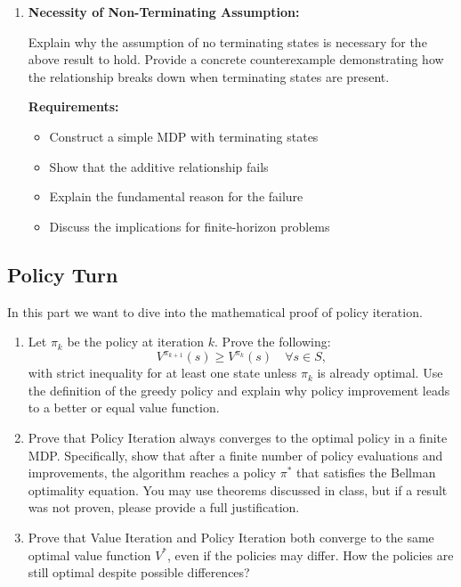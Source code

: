 \documentclass[12pt]{article}
\begin{document}
{{\begin{enumerate}[resume*]
    \textbf{Expected Result:} You should find that \( \hat{V}^*(s) = V^*(s) + \frac{r_0}{1-\gamma} \).

    \item \textbf{Necessity of Non-Terminating Assumption:}
    
    Explain why the assumption of no terminating states is necessary for the above result to hold. Provide a concrete counterexample demonstrating how the relationship breaks down when terminating states are present.
    
    \textbf{Requirements:}
    \begin{itemize}
        \item Construct a simple MDP with terminating states
        \item Show that the additive relationship fails
        \item Explain the fundamental reason for the failure
        \item Discuss the implications for finite-horizon problems
    \end{itemize}
\end{enumerate}



\subsection{Policy Turn}
In this part we want to dive into the mathematical proof of policy iteration.
\begin{enumerate}[resume*]
\item Let \( \pi_k \) be the policy at iteration \( k \). Prove the following:
    \[
    V^{\pi_{k+1}}(s) \geq V^{\pi_k}(s) \quad \forall s \in S,
    \]
    with strict inequality for at least one state unless \( \pi_k \) is already optimal. Use the definition of the greedy policy and explain why policy improvement leads to a better or equal value function.

    \item Prove that Policy Iteration always converges to the optimal policy in a finite MDP. Specifically, show that after a finite number of policy evaluations and improvements, the algorithm reaches a policy \( \pi^* \) that satisfies the Bellman optimality equation.  
    You may use theorems discussed in class, but if a result was not proven, please provide a full justification.
    
\item Prove that Value Iteration and Policy Iteration both converge to the same optimal value function \( V^* \), even if the policies may differ. How the policies are still optimal despite possible differences?


\end{enumerate}}}
\end{document}
